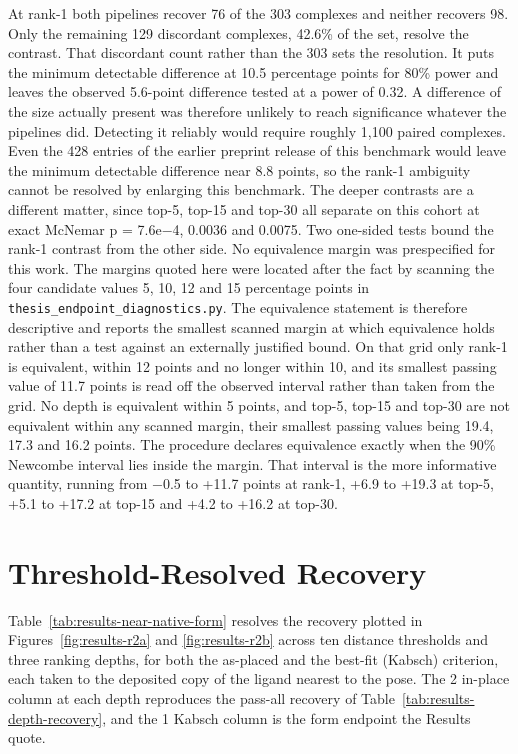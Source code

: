 At rank-1 both pipelines recover 76 of the 303 complexes and neither recovers 98. Only the remaining 129 discordant complexes, 42.6\% of the set, resolve the contrast. That discordant count rather than the 303 sets the resolution. It puts the minimum detectable difference at 10.5 percentage points for 80\% power and leaves the observed 5.6-point difference tested at a power of 0.32. A difference of the size actually present was therefore unlikely to reach significance whatever the pipelines did. Detecting it reliably would require roughly 1,100 paired complexes. Even the 428 entries of the earlier preprint release of this benchmark would leave the minimum detectable difference near 8.8 points, so the rank-1 ambiguity cannot be resolved by enlarging this benchmark. The deeper contrasts are a different matter, since top-5, top-15 and top-30 all separate on this cohort at exact McNemar p = 7.6e\ensuremath{-}4, 0.0036 and 0.0075. Two one-sided tests bound the rank-1 contrast from the other side. No equivalence margin was prespecified for this work. The margins quoted here were located after the fact by scanning the four candidate values 5, 10, 12 and 15 percentage points in \texttt{thesis\_endpoint\_diagnostics.py}. The equivalence statement is therefore descriptive and reports the smallest scanned margin at which equivalence holds rather than a test against an externally justified bound. On that grid only rank-1 is equivalent, within 12 points and no longer within 10, and its smallest passing value of 11.7 points is read off the observed interval rather than taken from the grid. No depth is equivalent within 5 points, and top-5, top-15 and top-30 are not equivalent within any scanned margin, their smallest passing values being 19.4, 17.3 and 16.2 points. The procedure declares equivalence exactly when the 90\% Newcombe interval lies inside the margin. That interval is the more informative quantity, running from \ensuremath{-}0.5 to +11.7 points at rank-1, +6.9 to +19.3 at top-5, +5.1 to +17.2 at top-15 and +4.2 to +16.2 at top-30.

\hypertarget{threshold-resolved-recovery}{%
\section{Threshold-Resolved Recovery}\label{threshold-resolved-recovery}}

Table~\ref{tab:results-near-native-form} resolves the recovery plotted in Figures~\ref{fig:results-r2a} and \ref{fig:results-r2b} across ten distance thresholds and three ranking depths, for both the as-placed and the best-fit (Kabsch) criterion, each taken to the deposited copy of the ligand nearest to the pose. The 2\angstrom{} in-place column at each depth reproduces the pass-all recovery of Table~\ref{tab:results-depth-recovery}, and the 1\angstrom{} Kabsch column is the form endpoint the Results quote.

